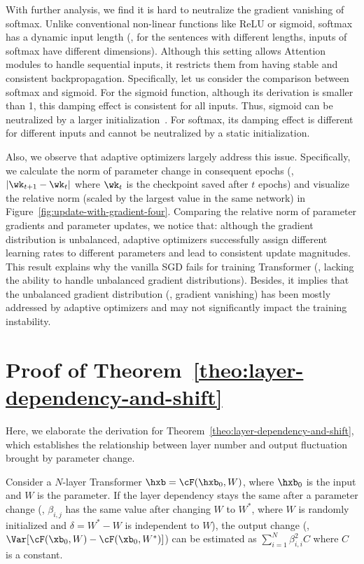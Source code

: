 With further analysis, we find it is hard to neutralize the gradient vanishing of softmax. 
Unlike conventional non-linear functions like ReLU or sigmoid, softmax has a dynamic input length (\ie, for the sentences with different lengths, inputs of softmax have different dimensions). 
Although this setting allows Attention modules to handle sequential inputs, it restricts them from having stable and consistent backpropagation. 
Specifically, let us consider the comparison between softmax and sigmoid. 
For the sigmoid function, although its derivation is smaller than 1, this damping effect is consistent for all inputs. 
Thus, sigmoid can be neutralized by a larger initialization~\cite{Glorot2010UnderstandingTD}. 
For softmax, its damping effect is different for different inputs and cannot be neutralized by a static initialization. 


Also, we observe that adaptive optimizers largely address this issue. 
Specifically, we calculate the norm of parameter change in consequent epochs (\eg, $|\wk_{t+1} - \wk_{t}|$ where $\wk_{t}$ is the checkpoint saved after $t$ epochs) and visualize the relative norm (scaled by the largest value in the same network) in Figure~\ref{fig:update-with-gradient-four}.  
Comparing the relative norm of parameter gradients and parameter updates, we notice that: although the gradient distribution is unbalanced, adaptive optimizers successfully assign different learning rates to different parameters and lead to consistent update magnitudes. 
This result explains why the vanilla SGD fails for training Transformer (\ie, lacking the ability to handle unbalanced gradient distributions). 
Besides, it implies that the unbalanced gradient distribution (\eg, gradient vanishing) has been mostly addressed by adaptive optimizers and may not significantly impact the training instability. 

\section{Proof of Theorem~\ref{theo:layer-dependency-and-shift}}
\label{appendix:theo2}

Here, we elaborate the derivation for Theorem~\ref{theo:layer-dependency-and-shift}, which establishes the relationship between layer number and output fluctuation brought by parameter change. 

\begin{theorem}
Consider a $N$-layer Transformer $\hxb = \cF(\hxb_0, W)$, where $\hxb_0$ is the input and $W$ is the parameter. 
If the layer dependency stays the same after a parameter change 
(\ie, $\beta_{i, j}$ has the same value after changing $W$ to $W^*$, where $W$ is randomly initialized and $\delta = W^* - W$ is independent to $W$), the output change (\ie, $\Var[\cF(\xb_0, W) - \cF(\xb_0, W^*)]$) can be estimated as $\sum_{i=1}^N \beta^2_{i, i} C$ where $C$ is a constant.
\end{theorem}

